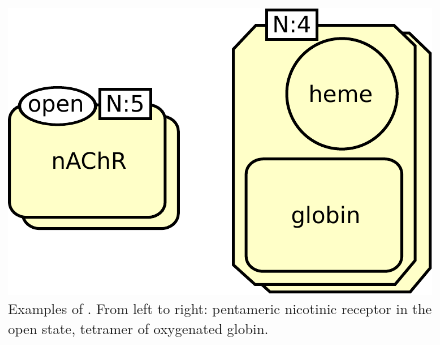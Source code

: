 \begin{figure}[H]
  \centering
  \includegraphics[scale = 0.5]{images/multimer-examples}
  \caption{Examples of . From left to right: pentameric nicotinic receptor in the open state, tetramer of oxygenated globin.}
  \label{fig:multimer-examples}
\end{figure}